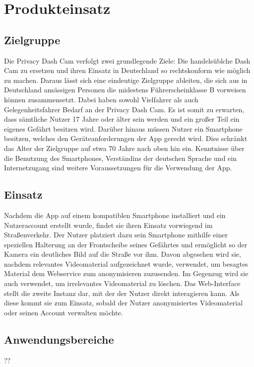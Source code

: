 \chapter{Produkteinsatz}

\section{Zielgruppe}
Die Privacy Dash Cam verfolgt zwei grundlegende Ziele: Die handelsüblche Dash Cam zu ersetzen und ihren Einsatz in Deutschland so rechtskonform wie möglich zu machen. Daraus lässt sich eine eindeutige Zielgruppe ableiten, die sich aus in Deutschland ansässigen Personen die midestens  Führerscheinklasse B vorweisen können zusammensetzt. Dabei haben sowohl Vielfahrer als auch Gelegenheitsfahrer Bedarf an der Privacy Dash Cam. Es ist somit zu erwarten, dass sämtliche Nutzer 17 Jahre oder älter sein werden und ein großer Teil ein eigenes Gefährt besitzen wird. Darüber hinaus müssen Nutzer ein Smartphone besitzen, welches den Geräteanforderungen der App gerecht wird. Dies schränkt das Alter der Zielgruppe auf etwa 70 Jahre nach oben hin ein. Kenntnisse über die Benutzung des Smartphones, Verständins der deutschen Sprache und ein Internetzugang sind weitere Voraussetzungen für die Verwendung der App.

\section{Einsatz}
Nachdem die App auf einem kompatiblen Smartphone installiert und ein Nutzeraccount erstellt wurde, findet sie ihren Einsatz vorwiegend im Straßenverkehr. Der Nutzer platziert dazu sein Smartphone mithilfe einer speziellen Halterung an der Frontscheibe seines Gefährtes und ermöglicht so der Kamera ein deutliches Bild  auf die Straße vor ihm. Davon abgesehen wird sie, nachdem relevantes Videomaterial aufgezeichnet wurde, verwendet, um besagtes Material dem Webservice zum anonymisieren zuzusenden. Im Gegenzug wird sie auch verwendet, um irrelevantes Videomaterial zu löschen.\newline
Das Web-Interface stellt die zweite Instanz dar, mit der der Nutzer direkt interagieren kann. Als diese kommt sie zum Einsatz, sobald der Nutzer anonymisiertes Videomaterial oder seinen Account verwalten möchte.


\section{Anwendungsbereiche} ??
